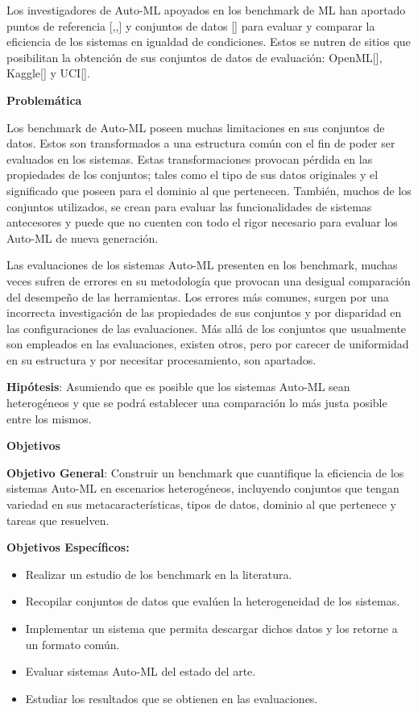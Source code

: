 Los investigadores de Auto-ML apoyados en los benchmark de ML han aportado puntos de referencia [\cite{10},\cite{15},\cite{31}] y conjuntos de datos [\cite{28}] para 
evaluar y comparar la eficiencia de los sistemas en igualdad de condiciones.  Estos se nutren de sitios que posibilitan la obtención de sus conjuntos de datos de 
evaluación: OpenML[\cite{43}], Kaggle[\cite{44}] y UCI[\cite{45}].

\begin{flushleft} 
    {\Large { \textbf{Problemática}}}
\end{flushleft}
Los benchmark de Auto-ML poseen muchas limitaciones en sus conjuntos de datos. Estos son transformados a una estructura común con el fin de poder ser evaluados en los 
sistemas. Estas transformaciones provocan pérdida en las propiedades de los conjuntos; tales como el tipo de sus datos originales y el significado que poseen para el 
dominio al que pertenecen. También, muchos de los conjuntos utilizados, se crean para evaluar las funcionalidades de sistemas antecesores y puede que no cuenten con 
todo el rigor necesario para evaluar los Auto-ML de nueva generación.

Las evaluaciones de los sistemas Auto-ML presenten en los benchmark, muchas veces sufren de errores en su metodología que provocan una desigual comparación del 
desempeño de las herramientas. Los errores más comunes, surgen por una incorrecta investigación de las propiedades de sus conjuntos y por disparidad 
en las configuraciones de las evaluaciones. Más allá de los conjuntos que usualmente son empleados en las evaluaciones, existen otros, pero por carecer de uniformidad 
en su estructura y por necesitar procesamiento, son apartados.


\textbf{Hipótesis}: Asumiendo que es posible que los sistemas Auto-ML sean heterogéneos y que se podrá establecer una comparación lo más 
justa posible entre los mismos.

\begin{flushleft} 
    {\Large {\textbf{Objetivos}}}
\end{flushleft}

\textbf{Objetivo General}: Construir un benchmark que cuantifique la eficiencia de los sistemas Auto-ML en escenarios heterogéneos, incluyendo conjuntos que tengan 
variedad en sus metacaracterísticas, tipos de datos, dominio al que pertenece y tareas que resuelven. 

\begin{flushleft} 
\textbf{Objetivos Específicos:}
\begin{itemize}
    \item Realizar un estudio de los benchmark en la literatura.
    \item Recopilar conjuntos de datos que evalúen la heterogeneidad de los sistemas.
    \item Implementar un sistema que permita descargar dichos datos y los retorne a un formato común.  
    \item Evaluar sistemas Auto-ML del estado del arte.
    \item Estudiar los resultados que se obtienen en las evaluaciones.
\end{itemize}
\end{flushleft} 
